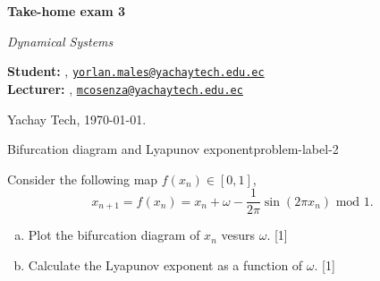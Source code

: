 





\textsf{\LARGE{\textbf{Take-home exam 3}}}

\normalsize{\textit{Dynamical Systems}}

\vspace{1ex}

\textsf{\textbf{Student:}} , 
\href{mailto:yorlan.males@yachaytech.edu.ec}{\texttt{yorlan.males@yachaytech.edu.ec}}\\
\textsf{\textbf{Lecturer:}} , 
\href{mcosenza@yachaytech.edu.ec}{\texttt{mcosenza@yachaytech.edu.ec}}

Yachay Tech, \today.

\vspace{2ex}

\begin{problem}{Bifurcation diagram and Lyapunov exponent}{problem-label-2}

Consider the following map $f(x_n) \in [0, 1]$,
\[
x_{n+1} = f(x_n) = x_n +\omega -\frac{1}{2\pi}\sin(2\pi x_n) \text{ mod } 1.
\]

\begin{enumerate}[(a)]
    \item Plot the bifurcation diagram of $x_n$ vesurs $\omega$. [1]
    \item Calculate the Lyapunov exponent as a function of $\omega$. [1]
\end{enumerate}
\end{problem}

